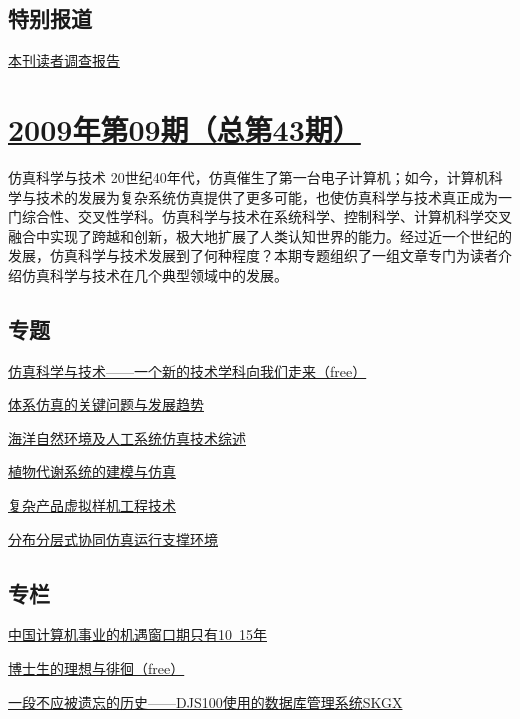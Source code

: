 \documentclass[a4paper]{article}
\begin{document}
\subsection{特别报道}
\href{http://history.ccf.org.cn/resources/1190201776262/2010/04/15/044088.pdf}{本刊读者调查报告}


\section{\href{http://history.ccf.org.cn/sites/ccf/jsjtbbd.jsp?contentId=2542567629046}{\textbf{2009年第09期（总第43期）}}}
仿真科学与技术 20世纪40年代，仿真催生了第一台电子计算机；如今，计算机科学与技术的发展为复杂系统仿真提供了更多可能，也使仿真科学与技术真正成为一门综合性、交叉性学科。仿真科学与技术在系统科学、控制科学、计算机科学交叉融合中实现了跨越和创新，极大地扩展了人类认知世界的能力。经过近一个世纪的发展，仿真科学与技术发展到了何种程度？本期专题组织了一组文章专门为读者介绍仿真科学与技术在几个典型领域中的发展。
\subsection{专题}
\href{http://history.ccf.org.cn/resources/1190201776262/2010/04/15/043006.pdf}{仿真科学与技术——一个新的技术学科向我们走来（free）}

\href{http://history.ccf.org.cn/resources/1190201776262/2010/04/15/043008.pdf}{体系仿真的关键问题与发展趋势}

\href{http://history.ccf.org.cn/resources/1190201776262/2010/04/15/043015.pdf}{海洋自然环境及人工系统仿真技术综述}

\href{http://history.ccf.org.cn/resources/1190201776262/2010/04/15/043022.pdf}{植物代谢系统的建模与仿真}

\href{http://history.ccf.org.cn/resources/1190201776262/2010/04/15/043028.pdf}{复杂产品虚拟样机工程技术}

\href{http://history.ccf.org.cn/resources/1190201776262/2010/04/15/043039.pdf}{分布分层式协同仿真运行支撑环境}

\subsection{专栏}
\href{http://history.ccf.org.cn/resources/1190201776262/2010/04/15/043052.pdf}{中国计算机事业的机遇窗口期只有10~15年}

\href{http://history.ccf.org.cn/resources/1190201776262/2010/04/15/043055.pdf}{博士生的理想与徘徊（free）}

\href{http://history.ccf.org.cn/resources/1190201776262/2010/04/15/043060.pdf}{一段不应被遗忘的历史——DJS100使用的数据库管理系统SKGX}
\end{document}
